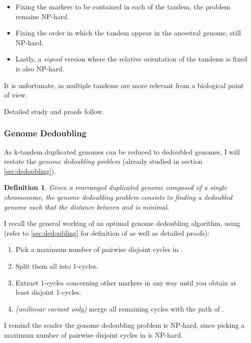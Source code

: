 \documentclass[11pt,final,twoside,nofrench]{thlifl}
\newtheorem{definition}{Definition}
\begin{document}
{\begin{itemize}
\item Fixing the markers to be contained in each of the  tandem, the problem remains NP-hard.

\item Fixing the order in which the tandem appear in the ancestral genome, still NP-hard. 

\item Lastly, a \emph{signed} version where the relative orientation of the
tandems is fixed is also NP-hard. 
\end{itemize}

It is unfortunate, as multiple tandems are more relevant from a biological point of view.

Detailed study and proofs follow.

\subsubsection{Genome Dedoubling}

As k-tandem duplicated genomes can be reduced to dedoubled
genomes, I will restate the \emph{genome dedoubling problem} (already studied in section \ref{sec:dedoubling}).

\begin{definition}
Given a rearranged duplicated genome  composed of a single chromosome, the
\emph{genome dedoubling problem} consists in finding a dedoubled genome  such
that the distance between  and  is minimal.
\end{definition}

I recall the general working of an optimal genome dedoubling algorithm, using  (refer to \ref{sec:dedoubling} for definition of  as well as detailed proofs):

\begin{enumerate}
\item{Pick a maximum number of pairwise disjoint cycles in .}

\item{Split them all into 1-cycles.}

\item{Extract 1-cycles concerning other markers in any way until you obtain at least  disjoint 1-cycles.}

\item{\textit{(unilinear variant only)} merge all remaining cycles with the path of .}

\end{enumerate}

I remind the reader the genome dedoubling problem is NP-hard, since picking a maximum number of pairwise disjoint cycles in  is NP-hard. 

}
\end{document}
